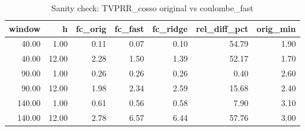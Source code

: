 \begin{table}[ht]
\centering
\begin{tabular}{rrrrrrr}
  \hline
window & h & fc\_orig & fc\_fast & fc\_ridge & rel\_diff\_pct & orig\_min \\ 
  \hline
40.00 & 1.00 & 0.11 & 0.07 & 0.10 & 54.79 & 1.90 \\ 
  40.00 & 12.00 & 2.28 & 1.50 & 1.39 & 52.17 & 1.70 \\ 
  90.00 & 1.00 & 0.26 & 0.26 & 0.26 & 0.40 & 2.60 \\ 
  90.00 & 12.00 & 1.98 & 2.34 & 2.59 & 15.68 & 2.40 \\ 
  140.00 & 1.00 & 0.61 & 0.56 & 0.58 & 7.90 & 3.10 \\ 
  140.00 & 12.00 & 2.78 & 6.57 & 6.44 & 57.76 & 3.00 \\ 
   \hline
\end{tabular}
\caption{Sanity check: TVPRR_cosso original vs coulombe_fast} 
\label{tab:sanity_coulombe}
\end{table}
